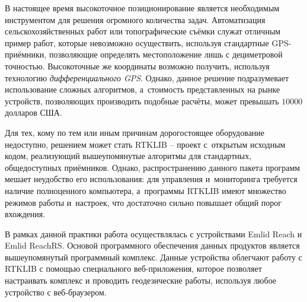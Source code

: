 \documentclass{../../scs-iam}
\begin{document}
  \pagestyle{headcenter}
  
  

  \setcounter{page}{1}
  
  
  В настоящее время высокоточное позиционирование является необходимым инструментом для решения огромного количества задач. Автоматизация сельскохозяйственных работ или топографические съёмки служат отличным пример работ, которые невозможно осуществить, используя стандартные GPS-приёмники, позволяющие определять местоположение лишь с дециметровой точностью. Высокоточные же координаты возможно получить, используя технологию \textit{дифференциального GPS}. Однако, данное решение подразумевает использование сложных алгоритмов, а~стоимость представленных на рынке устройств, позволяющих производить подобные расчёты, может превышать $10000$ долларов США. \par
  
  Для тех, кому по тем или иным причинам дорогостоящее оборудование недоступно, решением может стать RTKLIB -- проект с~открытым исходным кодом, реализующий вышеупомянутые алгоритмы для стандартных, общедоступных приёмников. Однако, распространению данного пакета программ мешает неудобство его использования: для управления и~мониторинга требуется наличие полноценного компьютера, а~программы RTKLIB имеют множество режимов работы и~настроек, что достаточно сильно повышает общий порог вхождения. \par
  
  В рамках данной практики работа осуществлялась с устройствами Emlid Reach и Emlid ReachRS. Основой программного обеспечения данных продуктов является вышеупомянутый программный комплекс. Данные устройства облегчают работу с RTKLIB с помощью специального веб-приложения, которое позволяет настраивать комплекс и проводить геодезические работы, используя любое устройство с веб-браузером.
\end{document}
